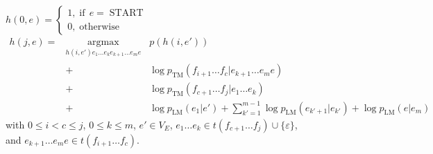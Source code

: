 \documentclass{article}
\newcommand{\nocomma}{}
\newcommand{\noplus}{}
\newcommand{\tmop}[1]{\ensuremath{\operatorname{#1}}}
\newcommand{\upl}{+}
\begin{document}
$h (0 \nocomma, e) = \left\{ \begin{array}{l}
  1 \nocomma, \tmop{if} \, e = \tmop{START}\\
  0 \nocomma, \tmop{otherwise}
\end{array} \right.$
\begin{eqnarray}
  h (j, e) = & \underset{h (i, e') e_1 \ldots e_k e_{k + 1} \ldots e_m
  e}{\tmop{argmax}}_{} & p (h (i, e')) \nonumber\\
  & + & \log p_{\tmop{TM}} (f_{i + 1} \ldots f_c |e_{k + 1} \ldots e_m e)
  \nonumber\\
  & \noplus + & \log p_{\tmop{TM}} (f_{c + 1} \ldots f_j |e_1 \ldots e_k)
  \nonumber\\
  & \upl & \log p_{\tmop{LM}} (e_1 |e') + \sum_{k' = 1}^{m - 1} \log
  p_{\tmop{LM}} (e_{k' + 1} |e_{k'}) + \log p_{\tmop{LM}} (e|e_m) \nonumber
\end{eqnarray}
with $0 \leq i < c \leq j$, $0 \leq k \leq m$, $e' \in V_E$, $e_1 \ldots e_k
\in t (f_{c + 1} \ldots f_j) \cup \{ \varepsilon \}$,\\
and $e_{k + 1} \ldots e_m e \in t (f_{i + 1} \ldots f_c)$.
\end{document}
